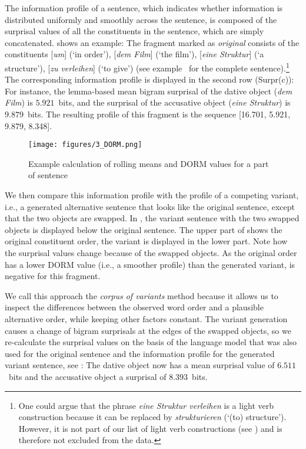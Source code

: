 \documentclass[output=paper,colorlinks,citecolor=brown]{langscibook}
\begin{document}
The information profile of a sentence, which indicates whether information is distributed uniformly and smoothly across the sentence, is composed of the surprisal values of all the constituents in the sentence, which are simply concatenated.  shows an example: The fragment marked as \textit{original} consists of the constituents [\textit{um}] (`in order'), [\textit{dem Film}] (`the film'), [\textit{eine Struktur}] (`a structure'), [\textit{zu verleihen}] (`to give') (see example~ for the complete sentence).\footnote{One could argue that the phrase \textit{eine Struktur verleihen} is a light verb construction because it can be replaced by \textit{strukturieren} (`(to) structure'). However, it is not part of our list of light verb constructions (see ) and is therefore not excluded from the data.} The corresponding information profile is displayed in the second row (Surpr(c)): For instance, the lemma-based mean bigram surprisal of the dative object (\textit{dem Film}) is $5.921$~bits, and the surprisal of the accusative object (\textit{eine Struktur}) is $9.879$~bits. The resulting profile of this fragment is the sequence [16.701, 5.921, 9.879, 8.348].

\begin{figure}
    \texttt{[image: figures/3\_DORM.png]}
    \caption{Example calculation of rolling means and DORM values for a part of sentence~}
    \label{fig:dorm_calculation}
\end{figure}

We then compare this information profile with the profile of a competing variant, i.e., a generated alternative sentence that looks like the original sentence, except that the two objects are swapped. In , the variant sentence with the two swapped objects is displayed below the original sentence. The upper part of  shows the original constituent order, the variant is displayed in the lower part. Note how the surprisal values change because of the swapped objects. As the original order has a lower DORM value (i.e., a smoother profile) than the generated variant, \DDIFF is negative for this fragment.

We call this approach the \textit{corpus of variants} method because it allows us to inspect the differences between the observed word order and a plausible alternative order, while keeping other factors constant. The variant generation causes a change of bigram surprisals at the edges of the swapped objects, so we re-calculate the surprisal values on the basis of the language model that was also used for the original sentence and the information profile for the generated variant sentence, see : The dative object now has a mean surprisal value of $6.511$~bits and the accusative object a surprisal of $8.393$~bits.
\end{document}

